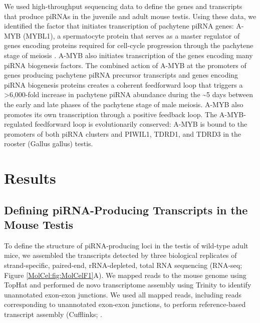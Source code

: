   We used high-throughput sequencing data to define the genes and transcripts that produce piRNAs in the juvenile and adult mouse testis. Using these data, we identified the factor that initiates transcription of pachytene piRNA genes: A-MYB (MYBL1), a spermatocyte protein that serves as a master regulator of genes encoding proteins required for cell-cycle progression through the pachytene stage of meiosis \citep{Trauth1994, Bolcun-Filas2011}. A-MYB also initiates transcription of the genes encoding many piRNA biogenesis factors. The combined action of A-MYB at the promoters of genes producing pachytene piRNA precursor transcripts and genes encoding piRNA biogenesis proteins creates a coherent feedforward loop that triggers a >6,000-fold increase in pachytene piRNA abundance during the \textasciitilde5 days between the early and late phases of the pachytene stage of male meiosis. A-MYB also promotes its own transcription through a positive feedback loop. The A-MYB-regulated feedforward loop is evolutionarily conserved: A-MYB is bound to the promoters of both piRNA clusters and PIWIL1, TDRD1, and TDRD3 in the rooster (Gallus gallus) testis.

\section{Results}

  \subsection{Defining piRNA-Producing Transcripts in the Mouse Testis}
    \label{MolCel:subsec:Defining piRNA transcripts}

    To define the structure of piRNA-producing loci in the testis of wild-type adult mice, we assembled the transcripts detected by three biological replicates of strand-specific, paired-end, rRNA-depleted, total RNA sequencing (RNA-seq; Figure \ref{MolCel:fig:MolCelF1}A). We mapped reads to the mouse genome using TopHat \citep{Trapnell2009} and performed de novo transcriptome assembly using Trinity \citep{Grabherr2011} to identify unannotated exon-exon junctions. We used all mapped reads, including reads corresponding to unannotated exon-exon junctions, to perform reference-based transcript assembly (Cufflinks; \citep{Trapnell2010}.

